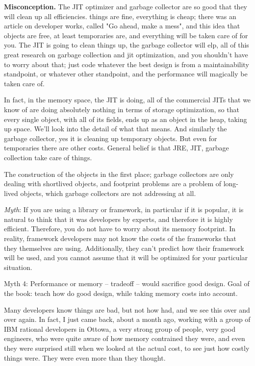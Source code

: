 \textbf{Misconception.} The JIT optimizer and garbage collector are so good that
they will clean up all efficiencies. things are fine, everything is cheap; there was an
article on developer works, called "Go ahead, make a mess",  and this idea that objects are free, at least temporaries are,
 and everything will be taken care of for you. The JIT is going to clean things up, the garbage collector will elp, 
 all of this great research 
  on garbage collection and jit optimization, and you shouldn't have to worry about that; just code whatever the best design 
  is from a maintainability standpoint, or whatever other standpoint, and the performance will magically be taken care of.

In fact, in the memory space, the JIT is doing, all of the commercial JITs that we know of are doing absolutely nothing 
in terms of storage optimization, so that every single object, with all of its fields, ends up as an object in the heap, 
taking up space.  We'll look into the detail of what that means. And similarly the garbage collector, yes it is cleaning up 
temporary objects. But even for temporaries there are other costs.
General belief is that JRE, JIT, garbage collection take care of things.

The construction of the objects in the first place; garbage collectors are only dealing with shortlived objects,
 and footprint problems are a problem of long-lived objects, which garbage collectors are not addressing at all.
 

\emph{Myth}: If you are using a library or framework, in particular if
it is popular, it is natural to think that it was developers by experts, and
therefore it is highly efficient. Therefore, you do not have to worry about
its memory footprint. In reality, framework developers may not know
the costs of the frameworks that they themselves are using.  Additionally, they
can't predict how their framework will be used, and you cannot assume that it
will be optimized for your particular situation.


Myth 4: Performance or memory -- tradeoff -- would sacrifice good design.
Goal of the book:  teach how do good design, while taking memory costs into account.

Many developers know things are bad, but not how had, and we see this over and over again. 
In fact, I just came back, about a month ago, working with a group of IBM rational developers in Ottowa, 
a very strong group of people, very good engineers, who were quite aware of how memory contrained they were,
 and even they were surprised still when we looked at the actual cost, to see just how costly things were. 
 They were even more than they thought.

